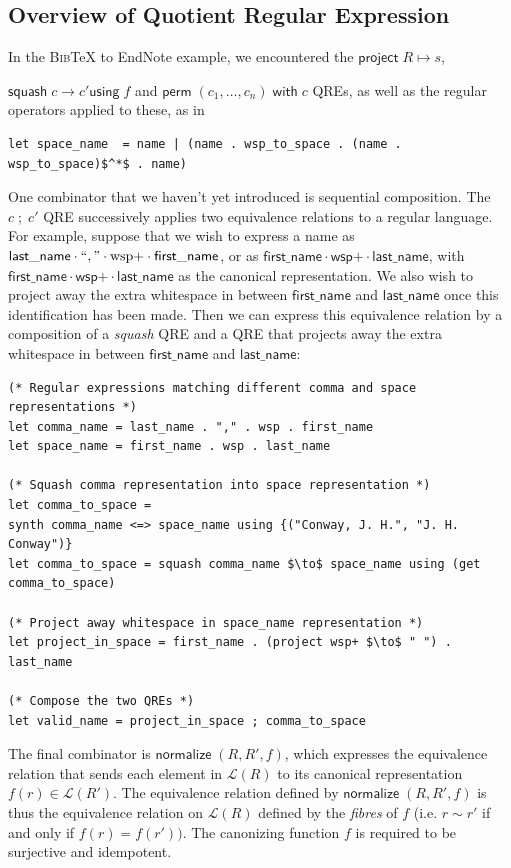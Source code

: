 \documentclass[acmsmall,review,anonymous]{acmart}
\newcommand{\kw}[1]{\ensuremath{\mathsf{#1}}}
\newcommand{\project}[2]{\ensuremath{\kw{project} \; #1 \mapsto #2}}
\newcommand{\squash}[3]{\ensuremath{\kw{squash} \; #1 \rightarrow #2
\kw{using} \; #3}}
\newcommand{\perm}[2]{\ensuremath{\kw{perm}\; (#1)\; \kw{with}\; #2}}
\newcommand{\normalize}[3]{\ensuremath{\kw{normalize} \; (#1, #2, #3)}}
\newcommand{\bibtex}{\textsc{Bib}\TeX{}}
\newcommand{\semicolon}{\ensuremath{\; ; \;}}
\begin{document}
\subsection{Overview of Quotient Regular Expression}
In the \bibtex{} to EndNote example, we encountered the $\project{R}{s}$,

\noindent $\squash{c}{c'}{f}$ and $\perm{c_1, \ldots, c_n}{c}$ QREs, as well as
the regular operators applied to these, as in

\begin{lstlisting}
let space_name  = name | (name . wsp_to_space . (name . wsp_to_space)$^*$ . name)
\end{lstlisting}

One combinator that we haven't yet introduced is sequential composition.
The $c \semicolon c'$ QRE successively applies
two equivalence relations to a regular language. For example, suppose that
we wish to express a name as $\kw{last\_name \cdot ``,\text{''} \cdot
\text{wsp+} \cdot first\_name}$, or as $\kw{first\_name\cdot \text{wsp+} \cdot
last\_name}$, with $\kw{first\_name\cdot \text{wsp+} \cdot last\_name}$ as the
canonical representation. We also wish to project away the extra whitespace in
between \kw{first\_name} and \kw{last\_name} once this identification has been
made. Then we can express this equivalence relation by a composition of a
\textit{squash} QRE and a QRE that projects away the extra whitespace in between
\kw{first\_name} and \kw{last\_name}:


\begin{lstlisting}
(* Regular expressions matching different comma and space representations *)
let comma_name = last_name . "," . wsp . first_name
let space_name = first_name . wsp . last_name

(* Squash comma representation into space representation *)
let comma_to_space =
synth comma_name <=> space_name using {("Conway, J. H.", "J. H. Conway")}
let comma_to_space = squash comma_name $\to$ space_name using (get comma_to_space)

(* Project away whitespace in space_name representation *)
let project_in_space = first_name . (project wsp+ $\to$ " ") . last_name

(* Compose the two QREs *)
let valid_name = project_in_space ; comma_to_space
\end{lstlisting}

The final combinator is $\normalize{R}{R'}{f}$, which expresses
the equivalence relation that sends each element in $\mathcal{L}(R)$ to its
canonical representation $f(r) \in \mathcal{L}(R')$. The equivalence relation
defined by $\normalize{R}{R'}{f}$ is thus the equivalence relation on
$\mathcal{L}(R)$ defined by the {\em fibres} of $f$ (i.e. $r \sim r'$ if and
only if $f(r) = f(r'))$. The canonizing function $f$ is required to be
surjective and idempotent.
\end{document}
